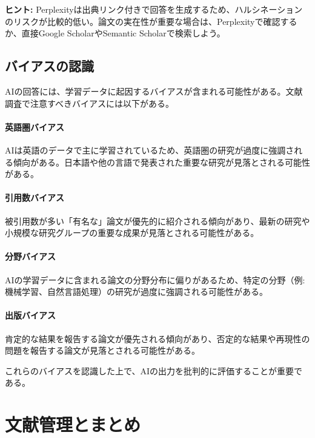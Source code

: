 \begin{screen}
\textbf{ヒント:} Perplexityは出典リンク付きで回答を生成するため、ハルシネーションのリスクが比較的低い。論文の実在性が重要な場合は、Perplexityで確認するか、直接Google ScholarやSemantic Scholarで検索しよう。
\end{screen}

\subsection{バイアスの認識}

AIの回答には、学習データに起因するバイアスが含まれる可能性がある。文献調査で注意すべきバイアスには以下がある。

\paragraph{英語圏バイアス}
AIは英語のデータで主に学習されているため、英語圏の研究が過度に強調される傾向がある。日本語や他の言語で発表された重要な研究が見落とされる可能性がある。

\paragraph{引用数バイアス}
被引用数が多い「有名な」論文が優先的に紹介される傾向があり、最新の研究や小規模な研究グループの重要な成果が見落とされる可能性がある。

\paragraph{分野バイアス}
AIの学習データに含まれる論文の分野分布に偏りがあるため、特定の分野（例: 機械学習、自然言語処理）の研究が過度に強調される可能性がある。

\paragraph{出版バイアス}
肯定的な結果を報告する論文が優先される傾向があり、否定的な結果や再現性の問題を報告する論文が見落とされる可能性がある。

これらのバイアスを認識した上で、AIの出力を批判的に評価することが重要である。

\section{文献管理とまとめ}
\label{sec:3.5}

